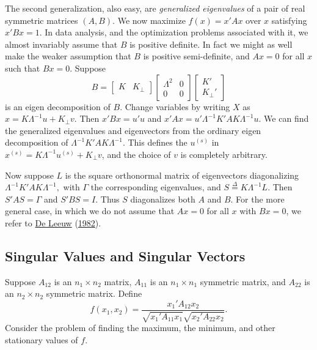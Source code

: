 \documentclass[
  12pt,
]{book}
\begin{document}
The second generalization, also easy, are \emph{generalized eigenvalues} of a pair of real symmetric matrices \((A,B)\). We now maximize \(f(x)=x'Ax\)
over \(x\) satisfying \(x'Bx=1\). In data analysis, and the optimization problems associated with it, we almost invariably assume that \(B\)
is positive definite. In fact we might as well make the weaker assumption that \(B\) is positive semi-definite, and \(Ax=0\) for all \(x\) such that \(Bx=0.\) Suppose
\[
B=\begin{bmatrix}K&K_\perp\end{bmatrix}
\begin{bmatrix}\Lambda^2&0\\0&0\end{bmatrix}
\begin{bmatrix}K'\\K_\perp'\end{bmatrix}
\]
is an eigen decomposition of \(B.\) Change variables by writing \(X\)
as \(x=K\Lambda^{-1}u+K_\perp v\). Then \(x'Bx=u'u\) and \(x'Ax=u'\Lambda^{-1}K'AK\Lambda^{-1}u\). We can find the generalized eigenvalues and eigenvectors from the ordinary eigen decomposition
of \(\Lambda^{-1}K'AK\Lambda^{-1}\). This defines the \(u^{(s)}\)
in \(x^{(s)}=K\Lambda^{-1}u^{(s)}+K_\perp v\), and the choice of \(v\) is completely arbitrary.

Now suppose \(L\) is the square orthonormal matrix of eigenvectors
diagonalizing \(\Lambda^{-1}K'AK\Lambda^{-1},\) with \(\Gamma\) the corresponding eigenvalues,
and \(S\mathop{=}\limits^{\Delta}K\Lambda^{-1}L\). Then \(S'AS=\Gamma\) and \(S'BS=I\).
Thus \(S\) diagonalizes both \(A\) and \(B\). For the more general case,
in which we do not assume that \(Ax=0\) for all \(x\) with \(Bx=0\),
we refer to \protect\hyperlink{ref-deleeuw_A_82b}{De Leeuw} (\protect\hyperlink{ref-deleeuw_A_82b}{1982}).

\hypertarget{singular-values-and-singular-vectors}{%
\subsection{Singular Values and Singular Vectors}\label{singular-values-and-singular-vectors}}

Suppose \(A_{12}\) is an \(n_1\times n_2\) matrix, \(A_{11}\) is an \(n_1\times n_1\) symmetric
matrix, and \(A_{22}\) is an \(n_2\times n_2\) symmetric matrix. Define
\[
f(x_1,x_2)=\frac{x_1'A_{12}x_2}{\sqrt{x_1'A_{11}x_1}\sqrt{x_2'A_{22}x_2}}.
\]
Consider the problem of finding the maximum, the minimum, and other stationary values of \(f\).
\end{document}
